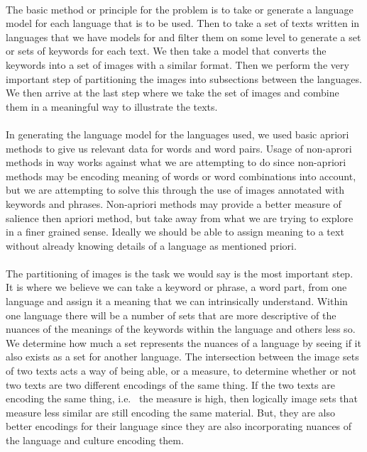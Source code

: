 \documentclass[12pt]{article}
\begin{document}
\paragraph{}
The basic method or principle for the problem is to take or generate a language model for
each language that is to be used. Then to take a set of texts written in languages that we
have models for and filter them on some level to generate a set or sets of keywords for each
text. We then take a model that converts the keywords into a set of images with a similar
format. Then we perform the very important step of partitioning the images into subsections
between the languages. We then arrive at the last step where we take the set of images and
combine them in a meaningful way to illustrate the texts.

\paragraph{}
In generating the language model for the languages used, we used basic apriori methods to
give us relevant data for words and word pairs. Usage of non-aprori methods in way works
against what we are attempting to do since non-apriori methods may be encoding meaning
of words or word combinations into account, but we are attempting to solve this through
the use of images annotated with keywords and phrases. Non-apriori methods may provide
a better measure of salience then apriori method, but take away from what we are trying
to explore in a finer grained sense. Ideally we should be able to assign meaning to a text
without already knowing details of a language as mentioned priori.

\paragraph{}
The partitioning of images is the task we would say is the most important step. It is where
we believe we can take a keyword or phrase, a word part, from one language and assign it a 
meaning that we can intrinsically understand. Within one language there will be a number of
sets that are more descriptive of the nuances of the meanings of the keywords within the
language and others less so. We determine how much a set represents the nuances of a 
language by seeing if it also exists as a set for another language. The intersection between
the image sets of two texts acts a way of being able, or a measure, to determine whether or 
not two texts are two different encodings of the same thing. If the two texts are encoding 
the same thing, i.e. \ the measure is high, then logically image sets that measure less similar
are still encoding the same material. But, they are also better encodings for their language
since they are also incorporating nuances of the language and culture encoding them.
\end{document}
